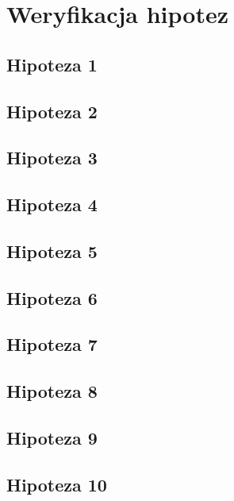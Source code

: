 \documentclass[12pt]{aghdpl}
\begin{document}
\chapter{Weryfikacja hipotez}
\label{chap:weryfikacja-hipotez}

\section{Hipoteza 1}


\section{Hipoteza 2}


\section{Hipoteza 3}


\section{Hipoteza 4}


\section{Hipoteza 5}


\section{Hipoteza 6}


\section{Hipoteza 7}


\section{Hipoteza 8}


\section{Hipoteza 9}


\section{Hipoteza 10}

\end{document}
